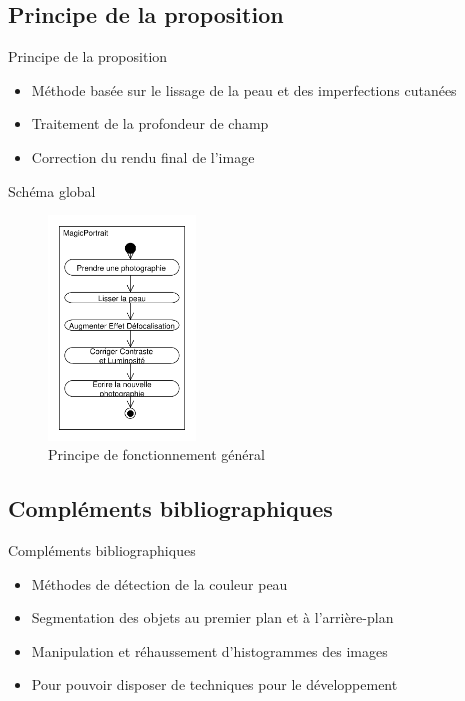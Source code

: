 \documentclass{beamer}
\begin{document}
\subsection{Principe de la proposition}

\begin{frame}{Principe de la proposition}
\begin{itemize}
\item Méthode basée sur le lissage de la peau et des imperfections cutanées
\item Traitement de la profondeur de champ
\item Correction du rendu final de l'image
\end{itemize}
\end{frame}

\begin{frame}{Schéma global}
\begin{figure}
\centering
\includegraphics[width=0.35\textwidth]{DiagrammeActivites_00_Global}
\caption{Principe de fonctionnement général}
\end{figure}
\end{frame}

\subsection{Compléments bibliographiques}

\begin{frame}{Compléments bibliographiques}
\begin{itemize}
\item Méthodes de détection de la couleur peau
\item Segmentation des objets au premier plan et à l'arrière-plan
\item Manipulation et réhaussement d'histogrammes des images
\item Pour pouvoir disposer de techniques pour le développement
\end{itemize}
\end{frame}
\end{document}
